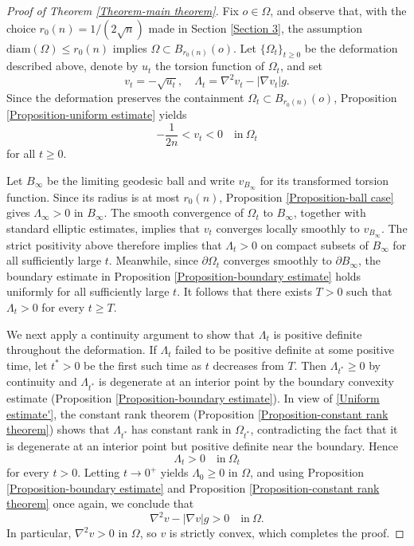\documentclass[11pt]{amsart}
\numberwithin{theorem}{section}
\numberwithin{equation}{section}
\begin{document}
\begin{proof}[Proof of Theorem \ref{Theorem-main theorem}]
Fix $o\in\Omega$, and observe that, with the choice $r_0(n)=1/(2\sqrt{n})$ made in Section \ref{Section 3}, the assumption $\mathrm{diam}(\Omega)\leq r_0(n)$ implies $\Omega\subset B_{r_0(n)}(o)$. Let $\{\Omega_t\}_{t\geq 0}$ be the deformation described above, denote by $u_t$ the torsion function of $\Omega_t$, and set $$v_t=-\sqrt{u_t},\quad \Lambda_t=\nabla^2v_t-|\nabla v_t|g.$$ Since the deformation preserves the containment $\Omega_t\subset B_{r_0(n)}(o)$, Proposition \ref{Proposition-uniform estimate} yields
\begin{equation}\label{Uniform estimate'}
-\frac{1}{2n}<v_t<0\quad\mathrm{in}\ \Omega_t
\end{equation}
for all $t\geq 0$.

Let $B_\infty$ be the limiting geodesic ball and write $v_{B_\infty}$ for its transformed torsion function. Since its radius is at most $r_0(n)$, Proposition \ref{Proposition-ball case} gives $\Lambda_\infty>0$ in $B_\infty$. The smooth convergence of $\Omega_t$ to $B_\infty$, together with standard elliptic estimates, implies that $v_t$ converges locally smoothly to $v_{B_\infty}$. The strict positivity above therefore implies that $\Lambda_t>0$ on compact subsets of $B_\infty$ for all sufficiently large $t$. Meanwhile, since $\partial\Omega_t$ converges smoothly to $\partial B_\infty$, the boundary estimate in Proposition \ref{Proposition-boundary estimate} holds uniformly for all sufficiently large $t$. It follows that there exists $T>0$ such that $\Lambda_t>0$ for every $t\geq T$.

We next apply a continuity argument to show that $\Lambda_t$ is positive definite throughout the deformation. If $\Lambda_t$ failed to be positive definite at some positive time, let $t^\ast>0$ be the first such time as $t$ decreases from $T$. Then $\Lambda_{t^\ast}\geq 0$ by continuity and $\Lambda_{t^\ast}$ is degenerate at an interior point by the boundary convexity estimate (Proposition \ref{Proposition-boundary estimate}). In view of \eqref{Uniform estimate'}, the constant rank theorem (Proposition \ref{Proposition-constant rank theorem}) shows that $\Lambda_{t^\ast}$ has constant rank in $\Omega_{t^\ast}$, contradicting the fact that it is degenerate at an interior point but positive definite near the boundary. Hence $$\Lambda_t>0\quad\mathrm{in}\ \Omega_t$$ for every $t>0$. Letting $t\rightarrow 0^+$ yields $\Lambda_0\geq 0$ in $\Omega$, and using Proposition \ref{Proposition-boundary estimate} and Proposition \ref{Proposition-constant rank theorem} once again, we conclude that $$\nabla^2v-|\nabla v|g>0\quad\mathrm{in}\ \Omega.$$ In particular, $\nabla^2v>0$ in $\Omega$, so $v$ is strictly convex, which completes the proof.
\end{proof}
\end{document}
